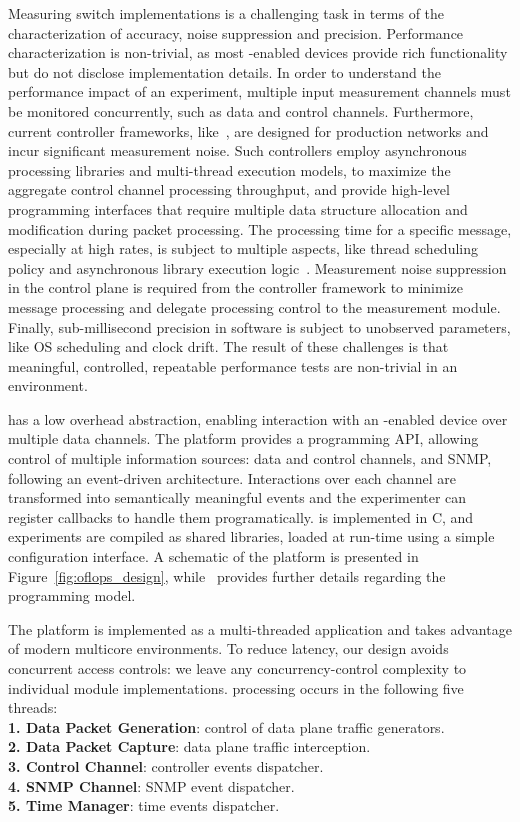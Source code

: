 Measuring \of switch implementations is a challenging task in terms of
the characterization of accuracy, noise suppression and precision.  Performance
characterization is non-trivial, as most \of-enabled devices provide rich
functionality but do not disclose implementation details. In order to understand
the performance impact of an experiment, multiple input measurement channels
must be monitored concurrently, such as data and control channels. Furthermore,
current controller frameworks, like~, are designed for
production networks and incur significant measurement noise. Such controllers
employ asynchronous processing libraries and multi-thread execution models, to
maximize the aggregate control channel processing throughput, and provide
high-level programming interfaces that require multiple data structure
allocation and modification during packet processing.  The processing time for a
specific \of message, especially at high rates, is subject to multiple aspects,
like thread scheduling policy and asynchronous library execution
logic~.  Measurement noise suppression in the control plane
is required from the controller framework to minimize message processing and
delegate processing control to the measurement module.  Finally, sub-millisecond
precision in software is subject to unobserved parameters, like OS scheduling
and clock drift. The result of these challenges is that meaningful, controlled,
repeatable performance tests are non-trivial in an \of environment.

\oflops has a low overhead abstraction, enabling interaction with an
\of-enabled device over multiple data channels.  The platform provides a
programming API, allowing control of multiple information sources: data and
control channels, and SNMP\@, following an event-driven architecture.
Interactions over each channel are transformed into semantically meaningful
events and the experimenter can register callbacks to handle them programatically.
\oflops is implemented in C, and experiments are compiled as shared libraries,
loaded at run-time using a simple configuration interface.  A schematic of the
platform is presented in Figure~\ref{fig:oflops_design}, while
~provides further details regarding the \oflops
programming model.

The platform is implemented as a multi-threaded application and takes
advantage of modern multicore environments. To reduce latency, our design
avoids concurrent access controls: we leave any concurrency-control complexity 
to individual module implementations. \oflops processing occurs in the following
five threads:\\
\textbf{1. Data Packet Generation}: control of data plane traffic generators.\\
\textbf{2. Data Packet Capture}: data plane traffic interception.\\
\textbf{3. Control Channel}: controller events dispatcher.\\
\textbf{4. SNMP Channel}: SNMP event dispatcher.\\
\textbf{5. Time Manager}: time events dispatcher.

